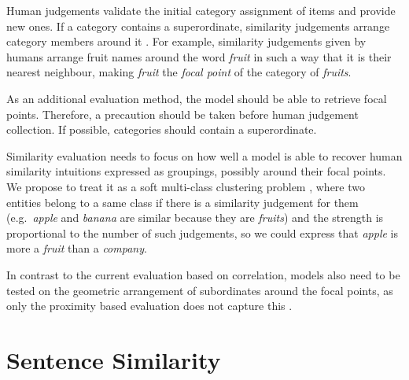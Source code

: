\documentclass[11pt]{article}
\begin{document}
Human judgements validate the initial category assignment of items and provide new ones. If a category contains a superordinate, similarity judgements arrange category members around it \cite{1986-13502-00119860101}. For example, similarity judgements given by humans arrange fruit names around the word \textit{fruit} in such a way that it is their nearest neighbour, making \textit{fruit} the \emph{focal point} of the category of \textit{fruits}.

As an additional evaluation method, the model should be able to retrieve focal points. Therefore, a precaution should be taken before human judgement collection. If possible, categories should contain a superordinate.

Similarity evaluation needs to focus on how well a model is able to recover human similarity intuitions expressed as groupings, possibly around their focal points. We propose to treat it as a soft multi-class clustering problem \cite{White:2015:WSE:2838931.2838932}, where two entities belong to a same class if there is a similarity judgement for them (e.g.~\textit{apple} and \textit{banana} are similar because they are \textit{fruits}) and the strength is proportional to the number of such judgements, so we could express that \textit{apple} is more a \textit{fruit} than a \textit{company}.

In contrast to the current evaluation based on correlation, models also need to be tested on the geometric arrangement of subordinates around the focal points, as only the proximity based evaluation does not capture this \cite{1986-13502-00119860101}.



\section{Sentence Similarity}
\end{document}
